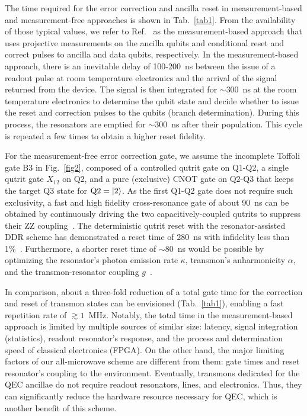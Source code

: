 \documentclass[aps,prl,twocolumn,groupedaddress,superscriptaddress]{revtex4}
\begin{document}
The time required for the error correction and ancilla reset in measurement-based and measurement-free approaches is shown in Tab.~\ref{tab1}.
From the availability of those typical values, we refer to Ref.~\cite{corcoles2021} as the measurement-based approach that uses projective measurements on the ancilla qubits and conditional reset and correct pulses to ancilla and data qubits, respectively.
In the measurement-based approach, there is an inevitable delay of 100-200~ns between the issue of a readout pulse at room temperature electronics and the arrival of the signal returned from the device.
The signal is then integrated for $\sim300$~ns at the room temperature electronics to determine the qubit state and decide whether to issue the reset and correction pulses to the qubits (branch determination).
During this process, the resonators are emptied for $\sim300$~ns after their population.
This cycle is repeated a few times to obtain a higher reset fidelity.

For the measurement-free error correction gate, we assume the incomplete Toffoli gate B3 in Fig.~\ref{fig2}, composed of a controlled qutrit gate on Q1-Q2, a single qutrit gate $X_{12}$ on Q2, and a pure (exclusive) CNOT gate on Q2-Q3 that keeps the target Q3 state for ${\rm Q2}=\ket{2}$.
As the first Q1-Q2 gate does not require such exclusivity, a fast and high fidelity cross-resonance gate of about 90~ns can be obtained by continuously driving the two capacitively-coupled qutrits to suppress their ZZ coupling~\cite{wei2021,mitchell2021}.
The deterministic qutrit reset with the resonator-assisted DDR scheme has demonstrated a reset time of 280~ns with infidelity less than 1\%~\cite{magnard2018}.
Furthermore, a shorter reset time of $\sim 80$~ns would be possible by optimizing the resonator's photon emission rate $\kappa$, transmon's anharmonicity $\alpha$, and the transmon-resonator coupling $g$~\cite{walter2017,magnard2018}.

In comparison, about a three-fold reduction of a total gate time for the correction and reset of transmon states can be envisioned (Tab.~\ref{tab1}), enabling a fast repetition rate of $\gtrsim 1$~MHz.
Notably, the total time in the measurement-based approach is limited by multiple sources of similar size: latency, signal integration (statistics), readout resonator's response, and the process and determination speed of classical electronics (FPGA).
On the other hand, the major limiting factors of our all-microwave scheme are different from them: gate times and reset resonator's coupling to the environment.
Eventually, transmons dedicated for the QEC ancillae do not require readout resonators, lines, and electronics.
Thus, they can significantly reduce the hardware resource necessary for QEC, which is another benefit of this scheme.
\end{document}
